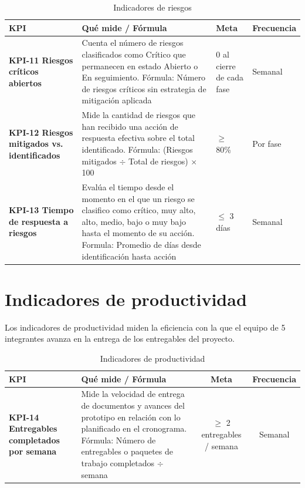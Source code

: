 \documentclass[11pt,spanish]{article}
\begin{document}
\begin{table}[H]
\centering
\small
\caption{Indicadores de riesgos}\label{tab:indicadores-riesgos}
\begin{tabularx}{\textwidth}{p{4.5cm} Y p{3cm} p{2.5cm}}
\toprule
\textbf{KPI} & \textbf{Qué mide / Fórmula} & \textbf{Meta} & \textbf{Frecuencia} \\
\midrule
\textbf{KPI-11 Riesgos críticos abiertos} & Cuenta el número de riesgos clasificados como Crítico que permanecen en estado Abierto o En seguimiento. Fórmula: Número de riesgos críticos sin estrategia de mitigación aplicada & 0 al cierre de cada fase & Semanal \\
\textbf{KPI-12 Riesgos mitigados vs. identificados} & Mide la cantidad de riesgos que han recibido una acción de respuesta efectiva sobre el total identificado. Fórmula: (Riesgos mitigados $\div$ Total de riesgos) $\times$ 100 & $\geq$ 80\% & Por fase \\
\textbf{KPI-13 Tiempo de respuesta a riesgos} & Evalúa el tiempo desde el momento en el que un riesgo se clasifico como crítico, muy alto, alto, medio, bajo o muy bajo hasta el momento de su acción. Formula: Promedio de días desde identificación hasta acción & $\leq$ 3 días & Semanal \\
\bottomrule
\end{tabularx}
\end{table}

\section{Indicadores de productividad}

Los indicadores de productividad miden la eficiencia con la que el equipo de 5 integrantes avanza en la entrega de los entregables del proyecto.

\begin{table}[H]
\centering
\small
\caption{Indicadores de productividad}\label{tab:indicadores-productividad}
\begin{tabularx}{\textwidth}{p{4.5cm} Y c c}
\toprule
\textbf{KPI} & \textbf{Qué mide / Fórmula} & \textbf{Meta} & \textbf{Frecuencia} \\
\midrule
\textbf{KPI-14 Entregables completados por semana} & Mide la velocidad de entrega de documentos y avances del prototipo en relación con lo planificado en el cronograma. Fórmula: Número de entregables o paquetes de trabajo completados $\div$ semana & $\geq$ 2 entregables / semana & Semanal \\
\bottomrule
\end{tabularx}
\end{table}
\end{document}
